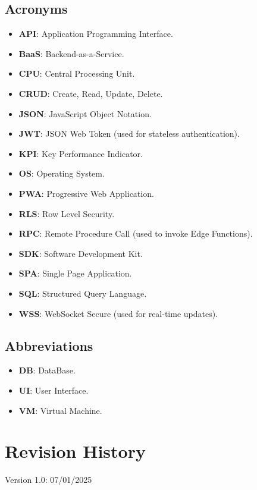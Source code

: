 \subsection{Acronyms}
\begin{itemize}
    \item \textbf{API}: Application Programming Interface.
    \item \textbf{BaaS}: Backend-as-a-Service.
    \item \textbf{CPU}: Central Processing Unit.
    \item \textbf{CRUD}: Create, Read, Update, Delete.
    \item \textbf{JSON}: JavaScript Object Notation.
    \item \textbf{JWT}: JSON Web Token (used for stateless authentication).
    \item \textbf{KPI}: Key Performance Indicator.
    \item \textbf{OS}: Operating System.
    \item \textbf{PWA}: Progressive Web Application.
    \item \textbf{RLS}: Row Level Security.
    \item \textbf{RPC}: Remote Procedure Call (used to invoke Edge Functions).
    \item \textbf{SDK}: Software Development Kit.
    \item \textbf{SPA}: Single Page Application.
    \item \textbf{SQL}: Structured Query Language.
    \item \textbf{WSS}: WebSocket Secure (used for real-time updates).
\end{itemize}

\subsection{Abbreviations}
\begin{itemize}
    \item \textbf{DB}: DataBase.
    \item \textbf{UI}: User Interface.
    \item \textbf{VM}: Virtual Machine.
\end{itemize}


\section{Revision History}
Version 1.0: 07/01/2025

